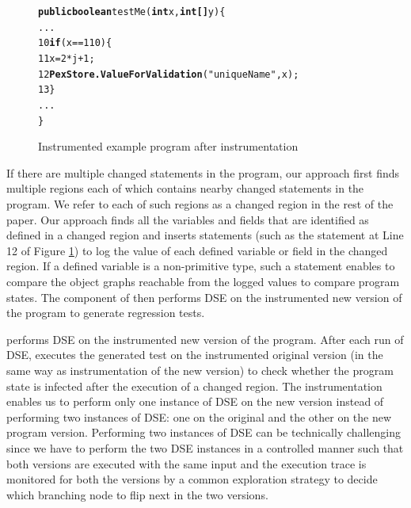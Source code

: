 \begin{figure}[t]
\begin{CodeOut}
\begin{alltt}
  \hspace{0.5cm}\textbf{public boolean} testMe(\textbf{int }x, \textbf{int[] } y)\{
  \hspace{1.0cm} ...
10\hspace{1.0cm} \textbf{if}(x == 110)\{	 
11\hspace{1.5cm} x = 2*j+1;
12\hspace{1.5cm} \textbf{PexStore.ValueForValidation}("uniqueName", x);
13\hspace{1.0cm} \} 
  \hspace{1.0cm} ...
  \}
\end{alltt}
\end{CodeOut}
\caption{Instrumented example program after instrumentation}
\label{fig:Changed}
\end{figure}

If there are multiple changed statements in the program, our approach first finds multiple regions each of which contains nearby changed statements in the program. We refer to each of such regions as a changed region in the rest of the paper. Our approach finds all the variables and fields that are identified as defined in a changed region and inserts statements (such as the statement at Line 12 of Figure \ref{fig:Changed}) to log the value of each defined variable or field in the changed region. If a defined variable is a non-primitive type, such a statement enables to compare the object graphs reachable from the logged values to compare program states. The  component of  then performs DSE on the instrumented new version of the program to generate regression tests. 

 performs DSE on the instrumented new version of the program. After each run of DSE,  executes the generated test on the instrumented original version (in the same way as instrumentation of the new version) to check whether the program state is infected after the execution of a changed region. The instrumentation enables us to perform only one instance of DSE on the new version instead of performing two instances of DSE: one on the original and the other on the new program version. Performing two instances of DSE can be technically challenging since we have to perform the two DSE instances in a controlled manner such that both versions are executed  with the same input and the execution trace is monitored for both the versions by a common exploration strategy to decide which branching node to flip next in the two versions. 

